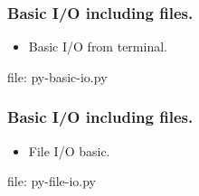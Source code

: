 
\begin{frame}[fragile]
\frametitle{Basic I/O including files.}
\newcommand{\newfilename}{py-basic-io.py}
\begin{itemize}
\item Basic I/O from terminal.

\end{itemize}
file: \newfilename
\end{frame}

\begin{frame}[fragile]
\frametitle{Basic I/O including files.}
\newcommand{\newfilename}{py-file-io.py}
\begin{itemize}
\item File I/O basic.

\end{itemize}
file: \newfilename
\end{frame}